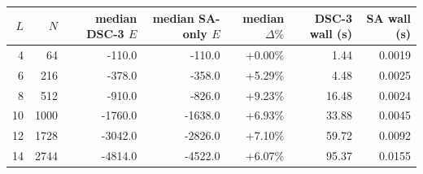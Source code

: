 \begin{tabular}{rrrrrrr}
\toprule
$L$ & $N$ & median DSC-3 $E$ & median SA-only $E$ & median $\Delta\%$ & DSC-3 wall (s) & SA wall (s) \\
\midrule
4 & 64 & -110.0 & -110.0 & +0.00\% & 1.44 & 0.0019 \\
6 & 216 & -378.0 & -358.0 & +5.29\% & 4.48 & 0.0025 \\
8 & 512 & -910.0 & -826.0 & +9.23\% & 16.48 & 0.0024 \\
10 & 1000 & -1760.0 & -1638.0 & +6.93\% & 33.88 & 0.0045 \\
12 & 1728 & -3042.0 & -2826.0 & +7.10\% & 59.72 & 0.0092 \\
14 & 2744 & -4814.0 & -4522.0 & +6.07\% & 95.37 & 0.0155 \\
\bottomrule
\end{tabular}
